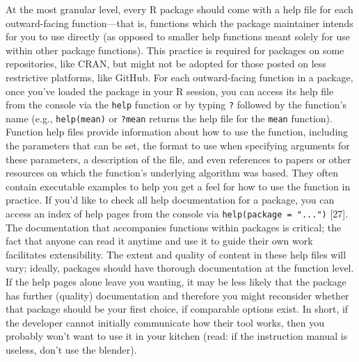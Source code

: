 \documentclass[10pt,letterpaper]{article}
\begin{document}
At the most granular level, every R package should come with a help file
for each outward-facing function---that is, functions which the package
maintainer intends for you to use directly (as opposed to smaller help
functions meant solely for use within other package functions). This
practice is required for packages on some repositories, like CRAN, but
might not be adopted for those posted on less restrictive platforms,
like GitHub. For each outward-facing function in a package, once you've
loaded the package in your R session, you can access its help file from
the console via the \texttt{help} function or by typing \texttt{?}
followed by the function's name (e.g., \texttt{help(mean)} or
\texttt{?mean} returns the help file for the \texttt{mean} function).
Function help files provide information about how to use the function,
including the parameters that can be set, the format to use when
specifying arguments for these parameters, a description of the file,
and even references to papers or other resources on which the function's
underlying algorithm was based. They often contain executable examples
to help you get a feel for how to use the function in practice. If you'd
like to check all help documentation for a package, you can access an
index of help pages from the console via
\texttt{help(package\ =\ "...")} {[}27{]}. The documentation that
accompanies functions within packages is critical; the fact that anyone
can read it anytime and use it to guide their own work facilitates
extensibility. The extent and quality of content in these help files
will vary; ideally, packages should have thorough documentation at the
function level. If the help pages alone leave you wanting, it may be
less likely that the package has further (quality) documentation and
therefore you might reconsider whether that package should be your first
choice, if comparable options exist. In short, if the developer cannot
initially communicate how their tool works, then you probably won't want
to use it in your kitchen (read: if the instruction manual is useless,
don't use the blender).
\end{document}
